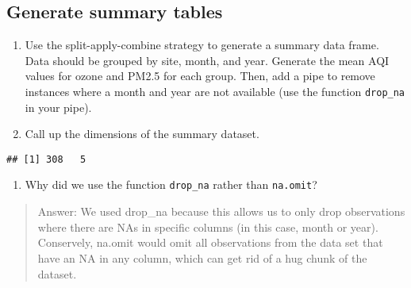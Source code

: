 \documentclass[]{article}
\newenvironment{Shaded}{\begin{snugshade}}{\end{snugshade}}
\newcommand{\CommentTok}[1]{\textcolor[rgb]{0.56,0.35,0.01}{\textit{#1}}}
\newcommand{\DataTypeTok}[1]{\textcolor[rgb]{0.13,0.29,0.53}{#1}}
\newcommand{\FloatTok}[1]{\textcolor[rgb]{0.00,0.00,0.81}{#1}}
\newcommand{\KeywordTok}[1]{\textcolor[rgb]{0.13,0.29,0.53}{\textbf{#1}}}
\newcommand{\NormalTok}[1]{#1}
\newcommand{\OperatorTok}[1]{\textcolor[rgb]{0.81,0.36,0.00}{\textbf{#1}}}
\newcommand{\StringTok}[1]{\textcolor[rgb]{0.31,0.60,0.02}{#1}}
\providecommand{\tightlist}{%
  \setlength{\itemsep}{0pt}\setlength{\parskip}{0pt}}
\begin{document}
\hypertarget{generate-summary-tables}{%
\subsection{Generate summary tables}\label{generate-summary-tables}}

\begin{enumerate}
\def\labelenumi{\arabic{enumi}.}
\setcounter{enumi}{11}
\item
  Use the split-apply-combine strategy to generate a summary data frame.
  Data should be grouped by site, month, and year. Generate the mean AQI
  values for ozone and PM2.5 for each group. Then, add a pipe to remove
  instances where a month and year are not available (use the function
  \texttt{drop\_na} in your pipe).
\item
  Call up the dimensions of the summary dataset.
\end{enumerate}

\begin{Shaded}
\end{Shaded}

\begin{verbatim}
## [1] 308   5
\end{verbatim}

\begin{enumerate}
\def\labelenumi{\arabic{enumi}.}
\setcounter{enumi}{13}
\tightlist
\item
  Why did we use the function \texttt{drop\_na} rather than
  \texttt{na.omit}?
\end{enumerate}

\begin{quote}
Answer: We used drop\_na because this allows us to only drop
observations where there are NAs in specific columns (in this case,
month or year). Conservely, na.omit would omit all observations from the
data set that have an NA in any column, which can get rid of a hug chunk
of the dataset.
\end{quote}
\end{document}
